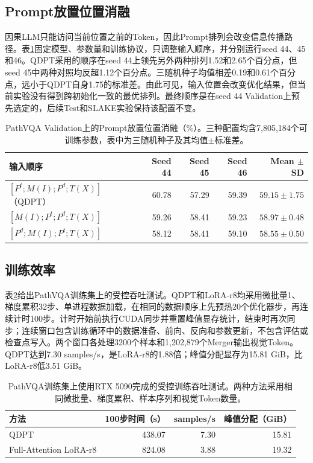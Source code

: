 \subsection{Prompt放置位置消融}

因果LLM只能访问当前位置之前的Token，因此Prompt排列会改变信息传播路径。表\ref{tab:prompt-placement}固定模型、参数量和训练协议，只调整输入顺序，并分别运行seed 44、45和46。QDPT采用的顺序在seed 44上领先另外两种排列1.52和2.65个百分点，但seed 45中两种对照均反超1.12个百分点。三随机种子均值相差0.19和0.61个百分点，远小于QDPT自身1.75的标准差。由此可见，输入位置会改变优化结果，但当前实验没有得到跨初始化一致的最优排列。最终顺序是在seed 44 Validation上预先选定的，后续Test和SLAKE实验保持该配置不变。

\begin{table}[t]
    \centering
    \caption{PathVQA Validation上的Prompt放置位置消融（\%）。三种配置均含7,805,184个可训练参数，表中为三随机种子及其均值$\pm$标准差。}
    \label{tab:prompt-placement}
    \scriptsize
    \begin{tabular}{@{}lrrrr@{}}
        \toprule
        输入顺序 & Seed 44 & Seed 45 & Seed 46 & Mean $\pm$ SD \\
        \midrule
        $[P^{t};M(I);P^{d};T(X)]$（QDPT） & 60.78 & 57.29 & 59.39 & $59.15\pm1.75$ \\
        $[M(I);P^{t};P^{d};T(X)]$ & 59.26 & 58.41 & 59.23 & $58.97\pm0.48$ \\
        $[P^{d};M(I);P^{t};T(X)]$ & 58.12 & 58.41 & 59.10 & $58.55\pm0.50$ \\
        \bottomrule
    \end{tabular}
\end{table}

\subsection{训练效率}

表\ref{tab:training-efficiency}给出PathVQA训练集上的受控吞吐测试。QDPT和LoRA-r8均采用微批量1、梯度累积32步、单进程数据加载，在相同的数据顺序上先预热20个优化器步，再连续计时100步。计时开始前执行CUDA同步并重置峰值显存统计，结束时再次同步；连续窗口包含训练循环中的数据准备、前向、反向和参数更新，不包含评估或检查点写入。两个窗口各处理3200个样本和1,202,879个Merger输出视觉Token。QDPT达到7.30 samples/s，是LoRA-r8的1.88倍；峰值分配显存为15.81 GiB，比LoRA-r8低3.51 GiB。

\begin{table}[t]
    \centering
    \caption{PathVQA训练集上使用RTX 5090完成的受控训练吞吐测试。两种方法采用相同微批量、梯度累积、样本序列和视觉Token数量。}
    \label{tab:training-efficiency}
    \small
    \begin{tabular}{@{}lrrr@{}}
        \toprule
        方法 & 100步时间（s） & samples/s & 峰值分配（GiB） \\
        \midrule
        QDPT & 438.07 & 7.30 & 15.81 \\
        Full-Attention LoRA-r8 & 824.08 & 3.88 & 19.32 \\
        \bottomrule
    \end{tabular}
\end{table}

